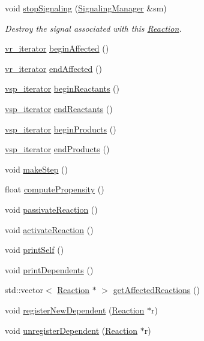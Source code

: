 \begin{DoxyCompactItemize}
void \hyperlink{classReaction_a6468804bff8607215f90ecd436f4902e}{stop\-Signaling} (\hyperlink{classSignalingManager}{Signaling\-Manager} \&sm)
\begin{DoxyCompactList}\small\item\em Destroy the signal associated with this \hyperlink{classReaction}{Reaction}. \end{DoxyCompactList}\item 
\hyperlink{group__Chemistry_ga3ffcd49efdca1415b74d13f1b9fea3e4}{vr\-\_\-iterator} \hyperlink{classReaction_a4f2ddd5987353443fc7f1a7e84f13c5a}{begin\-Affected} ()
\item 
\hyperlink{group__Chemistry_ga3ffcd49efdca1415b74d13f1b9fea3e4}{vr\-\_\-iterator} \hyperlink{classReaction_a7ef485814b5bf75b910bb3ffe6bb3b5b}{end\-Affected} ()
\item 
\hyperlink{group__Chemistry_ga3445ce7f270a9e9eb12a76b1da415dc4}{vsp\-\_\-iterator} \hyperlink{classReaction_a005362bc6cd1561ed32c4062ebda6105}{begin\-Reactants} ()
\item 
\hyperlink{group__Chemistry_ga3445ce7f270a9e9eb12a76b1da415dc4}{vsp\-\_\-iterator} \hyperlink{classReaction_a0931a78fec9f3ca9cd44fb12be228bc5}{end\-Reactants} ()
\item 
\hyperlink{group__Chemistry_ga3445ce7f270a9e9eb12a76b1da415dc4}{vsp\-\_\-iterator} \hyperlink{classReaction_ad6a2e6fa002e07ce8ffcb3d6745f8673}{begin\-Products} ()
\item 
\hyperlink{group__Chemistry_ga3445ce7f270a9e9eb12a76b1da415dc4}{vsp\-\_\-iterator} \hyperlink{classReaction_a4ece558d070f46cb217b976867f9489b}{end\-Products} ()
\item 
void \hyperlink{classReaction_a7912d3cb83062f195b713022490be6fa}{make\-Step} ()
\item 
float \hyperlink{classReaction_ac97b86c817977766b3a5d83d4d773b0a}{compute\-Propensity} ()
\item 
void \hyperlink{classReaction_a2c0d746fcbc968fc3fa8704e738ff03c}{passivate\-Reaction} ()
\item 
void \hyperlink{classReaction_a2f3233ceaabd2c62fa34441d12ff6e73}{activate\-Reaction} ()
\item 
void \hyperlink{classReaction_aa228c8f219d3f33413e8533d2921918b}{print\-Self} ()
\item 
void \hyperlink{classReaction_a7d00b7fc7276a1e219266384e0488783}{print\-Dependents} ()
\item 
std\-::vector$<$ \hyperlink{classReaction}{Reaction} $\ast$ $>$ \hyperlink{classReaction_a644e4fad3e02e65e8185b7d8f07cb296}{get\-Affected\-Reactions} ()
\item 
void \hyperlink{classReaction_a22b58c2d0994436fffdb9d24f12f2504}{register\-New\-Dependent} (\hyperlink{classReaction}{Reaction} $\ast$r)
\item 
void \hyperlink{classReaction_ab4abfe5cc099421141c1f310a8e82de5}{unregister\-Dependent} (\hyperlink{classReaction}{Reaction} $\ast$r)
\end{DoxyCompactItemize}
